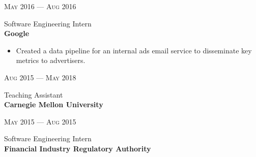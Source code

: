 \documentclass[10pt]{article} %
\begin{document}
{\begin{minipage}[t]{0.5\textwidth}
{\raggedleft\color{headings}\textsc{May 2016 --- Aug 2016}\par}

{\raggedright\large Software Engineering Intern
\\
\textbf{Google}\\[5pt]}

\normalsize
  \begin{itemize}
    \item Created a data pipeline for an internal ads email service to disseminate key metrics to advertisers.
  \end{itemize}


{\raggedleft\color{headings}\textsc{Aug 2015 --- May 2018}\par}
{\raggedright\large Teaching Assistant
\\
\textbf{Carnegie Mellon University}\\
[5pt]}



{\raggedleft\color{headings}\textsc{May 2015 --- Aug 2015}\par}

{\raggedright\large Software Engineering Intern\\
\textbf{Financial Industry Regulatory Authority}\\[5pt]}




\end{minipage} %
\hfill
\begin{minipage}[t]{0.44\textwidth} %
\vspace{15pt} %



\end{minipage}}
\end{document}
